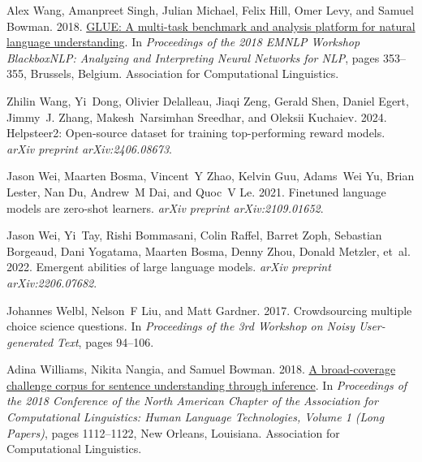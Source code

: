 \documentclass[11pt]{article}
\begin{document}
\begin{thebibliography}{88}
    Alex Wang, Amanpreet Singh, Julian Michael, Felix Hill, Omer Levy, and Samuel Bowman. 2018.
    \newblock \href {https://doi.org/10.18653/v1/W18-5446} {{GLUE}: A multi-task benchmark and analysis platform for natural language understanding}.
    \newblock In \emph{Proceedings of the 2018 {EMNLP} Workshop {B}lackbox{NLP}: Analyzing and Interpreting Neural Networks for {NLP}}, pages 353--355, Brussels, Belgium. Association for Computational Linguistics.
    
    Zhilin Wang, Yi~Dong, Olivier Delalleau, Jiaqi Zeng, Gerald Shen, Daniel Egert, Jimmy~J. Zhang, Makesh~Narsimhan Sreedhar, and Oleksii Kuchaiev. 2024.
    \newblock Helpsteer2: Open-source dataset for training top-performing reward models.
    \newblock \emph{arXiv preprint arXiv:2406.08673}.
    
    Jason Wei, Maarten Bosma, Vincent~Y Zhao, Kelvin Guu, Adams~Wei Yu, Brian Lester, Nan Du, Andrew~M Dai, and Quoc~V Le. 2021.
    \newblock Finetuned language models are zero-shot learners.
    \newblock \emph{arXiv preprint arXiv:2109.01652}.
    
    Jason Wei, Yi~Tay, Rishi Bommasani, Colin Raffel, Barret Zoph, Sebastian Borgeaud, Dani Yogatama, Maarten Bosma, Denny Zhou, Donald Metzler, et~al. 2022.
    \newblock Emergent abilities of large language models.
    \newblock \emph{arXiv preprint arXiv:2206.07682}.
    
    Johannes Welbl, Nelson~F Liu, and Matt Gardner. 2017.
    \newblock Crowdsourcing multiple choice science questions.
    \newblock In \emph{Proceedings of the 3rd Workshop on Noisy User-generated Text}, pages 94--106.
    
    Adina Williams, Nikita Nangia, and Samuel Bowman. 2018.
    \newblock \href {https://doi.org/10.18653/v1/N18-1101} {A broad-coverage challenge corpus for sentence understanding through inference}.
    \newblock In \emph{Proceedings of the 2018 Conference of the North {A}merican Chapter of the Association for Computational Linguistics: Human Language Technologies, Volume 1 (Long Papers)}, pages 1112--1122, New Orleans, Louisiana. Association for Computational Linguistics.
    

\end{thebibliography}
\end{document}
